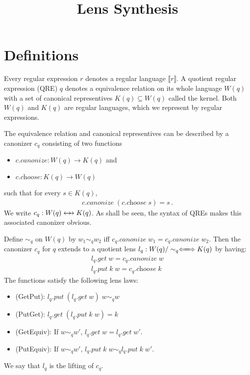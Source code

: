 \documentclass[a4paper,11pt] {article}
\theoremstyle{plain}
\newcommand{\negjoinrel}{\mathrel{\mkern3mu}}
\newcommand{\rlaprel}[1]{\mathrel{\mathrlap{#1}}}
\newcommand{\lget}[1]{\textit{$#1$.get}}
\newcommand{\lput}[1]{\textit{$#1$.put}}
\newcommand{\lcreate}[1]{\textit{$#1$.create}}
\newcommand{\lcanonize}[1]{\textit{$#1$.canonize}}
\newcommand{\lchoose}[1]{\textit{$#1$.choose}}
\newcommand{\canon}{\rlaprel{\longleftarrow}\rlaprel{\longrightarrow}
  \negjoinrel\rightarrow\;\,}
\newcommand{\lensbetween}[1]{\xLongleftrightarrow{#1}}
\newcommand{\name}[1]{\textsf{#1}}
\begin{document}
\title{Lens Synthesis}
\date{}
\maketitle



\section{Definitions}
\label{sec:definitions}
Every regular expression $r$ denotes a regular language $\llbracket r \rrbracket$.
A quotient regular expression (QRE) $q$ denotes a equivalence relation
on its whole language $W(q)$ with a set of canonical representives
$K(q) \subseteq W(q)$ called the kernel.
Both $W(q)$ and $K(q)$ are regular
languages, which we represent by regular expressions.

The equivalence relation and canonical representives 
can be described by a canonizer $c_q$
consisting of two functions
\begin{itemize}
\item $\lcanonize{c}: W(q) \to K(q)$ and
\item $\lchoose{c}: K(q) \to W(q)$
\end{itemize}
such that for every $s \in K(q)$,
\begin{align*}
  \lcanonize{c} \; (\lchoose{c} \; s) = s \, .
\end{align*}
We write $c_q: W(q) \canon K(q)$.
As shall be seen, the syntax of QREs makes this associated canonizer obvious.

Define $\sim_q$ on $W(q)$ by $w_1 \sim_q w_2$ iff
$\lcanonize{c_q} \; w_1 = \lcanonize{c_q} \; w_2$.
Then the canonizer $c_q$ for $q$ extends to a quotient lens
$l_q: W(q)/\sim_q \lensbetween{} K(q)$ by having:
\begin{gather*}
  \lget{l_q} \; w = \lcanonize{c_q} \; w\\
  \lput{l_q} \; k \; w = \lchoose{c_q} \; k 
\end{gather*}
The functions satisfy the following lens laws:
\begin{itemize}
\item (\name{GetPut}): $\lput{l_q} \; (\lget{l_q} \; w) \; w \sim_q w$ 
\item (\name{PutGet}): $\lget{l_q} \; (\lput{l_q} \; k \; w) = k$
\item (\name{GetEquiv}): If $w \sim_q w'$,
  $\lget{l_q} \; w = \lget{l_q} \; w'$.
\item (\name{PutEquiv}): If $w \sim_q w'$,
  $\lput{l_q} \; k \; w \sim_q \lput{l_q} \; k \; w'$.
\end{itemize}
We say that $l_q$ is the lifting of $c_q$.
\end{document}
